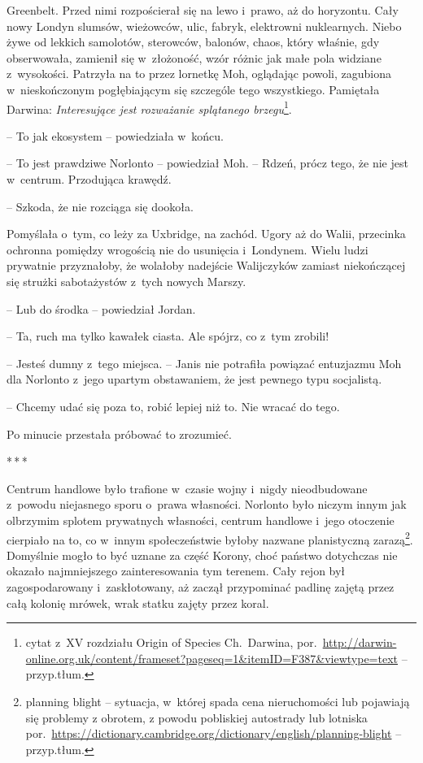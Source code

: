 \documentclass[oneside,polish,11pt,sfheadings]{mwbk}
\newcommand{\threeast}{\bigskip\par\centerline{*\,*\,*}\medskip\par}%
\begin{document}
Greenbelt. Przed nimi rozpościerał się na lewo i~prawo, aż do horyzontu.
Cały nowy Londyn slumsów, wieżowców, ulic, fabryk, elektrowni
nuklearnych. Niebo żywe od lekkich samolotów, sterowców, balonów, chaos,
który właśnie, gdy obserwowała, zamienił się w~złożoność, wzór różnic
jak małe pola widziane z~wysokości. Patrzyła na to przez lornetkę Moh,
oglądając powoli, zagubiona w~nieskończonym pogłębiającym się szczególe
tego wszystkiego. Pamiętała Darwina: \emph{Interesujące jest rozważanie
splątanego brzegu}\footnote{cytat z~XV rozdziału Origin of Species
Ch.~Darwina, por.~\url{http://darwin-online.org.uk/content/frameset?pageseq=1\&itemID=F387\&viewtype=text}
-- przyp.tłum.}.

-- To jak ekosystem -- powiedziała w~końcu.

-- To jest prawdziwe Norlonto -- powiedział Moh. -- Rdzeń, prócz tego, że
nie jest w~centrum. Przodująca krawędź.

-- Szkoda, że nie rozciąga się dookoła.

Pomyślała o~tym, co leży za Uxbridge, na zachód. Ugory aż do Walii,
przecinka ochronna pomiędzy wrogością nie do usunięcia i~Londynem. Wielu
ludzi prywatnie przyznałoby, że wolałoby nadejście Walijczyków zamiast
niekończącej się strużki sabotażystów z~tych nowych Marszy.

-- Lub do środka -- powiedział Jordan.

-- Ta, ruch ma tylko kawałek ciasta. Ale spójrz, co z~tym zrobili!

-- Jesteś dumny z~tego miejsca. -- Janis nie potrafiła powiązać entuzjazmu
Moh dla Norlonto z~jego upartym obstawaniem, że jest pewnego typu
socjalistą.

-- Chcemy udać się poza to, robić lepiej niż to. Nie wracać do tego.

Po minucie przestała próbować to zrozumieć.
  \threeast 

Centrum handlowe było trafione w~czasie wojny i~nigdy nieodbudowane z~powodu niejasnego sporu o~prawa własności. Norlonto było niczym innym
jak olbrzymim splotem prywatnych własności, centrum handlowe i~jego
otoczenie cierpiało na to, co w~innym społeczeństwie byłoby nazwane
planistyczną zarazą\footnote{planning blight -- sytuacja, w~której spada cena
nieruchomości lub pojawiają się problemy z obrotem, z powodu pobliskiej autostrady
lub lotniska
por.~\url{https://dictionary.cambridge.org/dictionary/english/planning-blight}
-- przyp.tłum.}. Domyślnie mogło to być uznane za część Korony, choć
państwo dotychczas nie okazało najmniejszego zainteresowania tym
terenem. Cały rejon był zagospodarowany i~zaskłotowany, aż zaczął
przypominać padlinę zajętą przez całą kolonię mrówek, wrak statku zajęty
przez koral.
\end{document}
